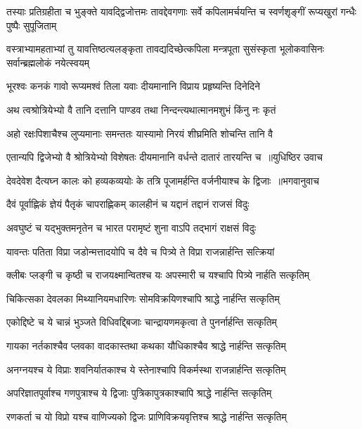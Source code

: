 \threelineshloka
{तस्याः प्रतिग्रहीता च भुङ्क्ते यावद्द्विजोत्तमः}
{तावद्देवगणाः सर्वे कपिलामर्चयन्ति च}
{स्वर्णशृङ्गीं रूप्यखुरां गन्धैः पुष्पैः सुपूजिताम्}


\threelineshloka
{वस्त्राभ्यामहताभ्यां तु यावत्तिष्ठत्यलङ्कृता}
{तावद्यदिच्छेत्कपिला मन्त्रपूता सुसंस्कृता}
{भूलोकवासिनः सर्वान्ब्रह्मलोकं नयेत्स्वयम्}


\twolineshloka
{भूरश्वः कनकं गावो रूप्यमश्वं तिला यवाः}
{दीयमानानि विप्राय प्रहृष्यन्ति दिनेदिने}


\twolineshloka
{अथ त्वश्रोत्रियेभ्यो वै तानि दत्तानि पाण्डव}
{तथा निन्दन्त्यथात्मानमशुभं किंनु नः कृतं}


\twolineshloka
{अहो रक्षःपिशाचैश्च लुप्यमानाः समन्ततः}
{यास्यामो निरयं शीघ्रमिति शोचन्ति तानि वै}


\threelineshloka
{एतान्यपि द्विजेभ्यो वै श्रोत्रियेभ्यो विशेषतः}
{दीयमानानि वर्धन्ते दातारं तारयन्ति च ॥युधिष्ठिर उवाच}
{}


\threelineshloka
{देवदेवेश दैत्यघ्न कालः को हव्यकव्ययोः}
{के तत्रि पूजामर्हन्ति वर्जनीयाश्च के द्विजाः ॥भगवानुवाच}
{}


\twolineshloka
{दैवं पूर्वाह्णिकं ज्ञेयं पैतृकं चापराह्णिकम्}
{कालहीनं च यद्दानं तद्दानं राजसं विदुः}


\twolineshloka
{अवघुष्टं च यद्भुक्तमनृतेन च भारत}
{परामृष्टं शुना वाऽपि तद्भागं राक्षसं विदुः}


\twolineshloka
{यावन्तः पतिता विप्रा जडोन्मत्तादयोपि च}
{दैवे च पित्र्ये ते विप्रा राजन्नार्हन्ति सत्क्रियां}


\twolineshloka
{क्लीबः प्लङ्गी च कृष्ठी च राजयक्ष्मान्वितश्च यः}
{अपस्मारी च यश्चापि पित्र्ये नार्हति सत्कृतिम्}


\twolineshloka
{चिकित्सका देवलका मिथ्यानियमधारिणः}
{सोमविक्रयिणश्चापि श्राद्धे नार्हन्ति सत्कृतिम्}


\twolineshloka
{एकोद्दिष्टे च ये चान्नं भुञ्जते विधिवद्द्बिजाः}
{चान्द्रायणमकृत्वा ते पुनर्नार्हन्ति सत्कृतिम्}


\twolineshloka
{गायका नर्तकाश्चैव प्लवका वादकास्तथा}
{कथका यौधिकाश्चैव श्राद्धे नार्हन्ति सत्कृतिम्}


\twolineshloka
{अनग्नयश्च ये विप्राः शवनिर्यातकाश्च ये}
{स्तेनाश्चापि विकर्मस्था राजन्नार्हन्ति सत्कृतिम्}


\twolineshloka
{अपरिज्ञातपूर्वाश्च गणपुत्राश्च ये द्विजाः}
{पुत्रिकापुत्रकाश्चापि श्राद्धे नार्हन्ति सत्कृतिम्}


\twolineshloka
{रणकर्ता च यो विप्रो यश्च वाणिज्यको द्विजः}
{प्राणिविक्रयवृत्तिश्च श्राद्धे नार्हन्ति सत्कृतिम्}


